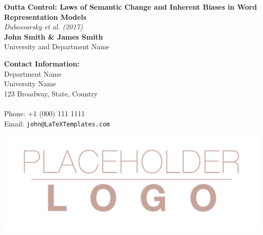 \documentclass[a0,landscape]{a0poster}
\begin{document}



\begin{minipage}[b]{0.55\linewidth}
  \veryHuge \color{NavyBlue} \textbf{Outta Control: Laws of Semantic Change and Inherent Biases in Word Representation Models} \color{Black}\\ %
  \Huge \textit{Dubossarsky et al. (2017)}\\[1cm] %
  \huge \textbf{John Smith \& James Smith}\\ %
  \huge University and Department Name\\ %
\end{minipage}
%
\begin{minipage}[b]{0.25\linewidth}
  \color{DarkSlateGray}\Large \textbf{Contact Information:}\\
  Department Name\\ %
  University Name\\
  123 Broadway, State, Country\\\\
  Phone: +1 (000) 111 1111\\ %
  Email: \texttt{john@LaTeXTemplates.com}\\ %
\end{minipage}
%
\begin{minipage}[b]{0.19\linewidth}
  \includegraphics[width=20cm]{logo.png} %
\end{minipage}
\end{document}
